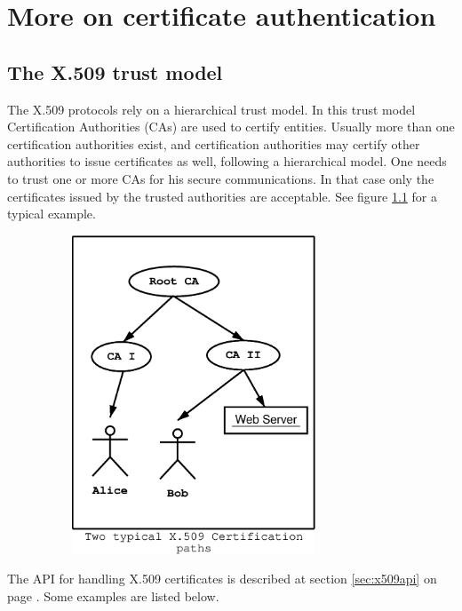 \chapter{More on certificate authentication}
\label{certificate}

\section{The X.509 trust model}
\label{x509:trust}

The X.509 protocols rely on a hierarchical trust model. In this trust model
Certification Authorities (CAs) are used to certify entities.
Usually more than one certification authorities exist, and certification
authorities may certify other authorities to issue certificates as well,
following a hierarchical model. 
One needs to trust one or more CAs for his secure
communications. In that case only the certificates issued by the trusted
authorities are acceptable. See figure \ref{fig:x509-1} for a typical example.

\begin{figure}[hbtp]
\includegraphics[height=9.5cm,width=9cm]{x509-1}
\label{fig:x509-1}
\end{figure}


The API for handling X.509 certificates is described at section \ref{sec:x509api}
on page \pageref{sec:x509api}. Some examples are listed below.



